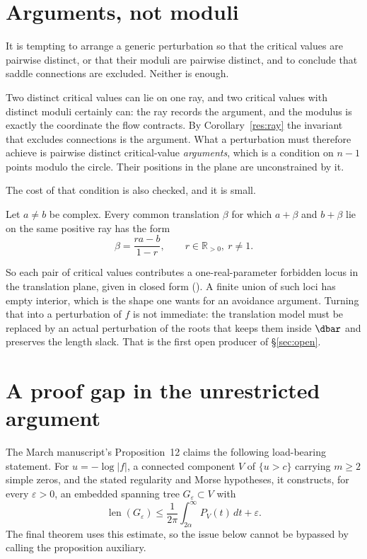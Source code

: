 \section{Arguments, not moduli}\label{sec:arguments}

It is tempting to arrange a generic perturbation so that the critical values
are pairwise distinct, or that their moduli are pairwise distinct, and to
conclude that saddle connections are excluded.  Neither is enough.

Two distinct critical values can lie on one ray, and two critical values with
distinct moduli certainly can: the ray records the argument, and the modulus is
exactly the coordinate the flow contracts.  By Corollary~\ref{res:ray} the
invariant that excludes connections is the argument.  What a perturbation must
therefore achieve is pairwise distinct critical-value \emph{arguments}, which is
a condition on $n-1$ points modulo the circle.  Their positions in the plane
are unconstrained by it.

The cost of that condition is also checked, and it is small.

\begin{theorem}\label{res:locus}
Let $a\ne b$ be complex.  Every common translation $\beta$ for which $a+\beta$
and $b+\beta$ lie on the same positive ray has the form
\[
  \beta=\frac{ra-b}{1-r},
  \qquad r\in\mathbb{R}_{>0},\ r\ne1 .
\]
\end{theorem}

\noindent So each pair of critical values contributes a one-real-parameter
forbidden locus in the translation plane, given in closed form
().  A finite union of such
loci has empty interior, which is the shape one wants for an avoidance
argument.  Turning that into a perturbation of $f$ is not immediate: the
translation model must be replaced by an actual perturbation of the roots that
keeps them inside $\dbar$ and preserves the length slack.  That is the first
open producer of \S\ref{sec:open}.

\section{A proof gap in the unrestricted argument}\label{sec:gap}

The March manuscript's Proposition~12 claims the following load-bearing
statement.  For $u=-\log|f|$, a connected component $V$ of $\{u>c\}$ carrying
$m\ge2$ simple zeros, and the stated regularity and Morse hypotheses, it
constructs, for every $\varepsilon>0$, an embedded spanning tree
$G_\varepsilon\subset V$ with
\[
 \operatorname{len}(G_\varepsilon)
 \le\frac1{2\pi}\int_{2\alpha}^{\infty}P_V(t)\,dt+\varepsilon.
\tag{5.1}\label{eq:prop12-bound}
\]
The final theorem uses this estimate, so the issue below cannot be bypassed by
calling the proposition auxiliary.

